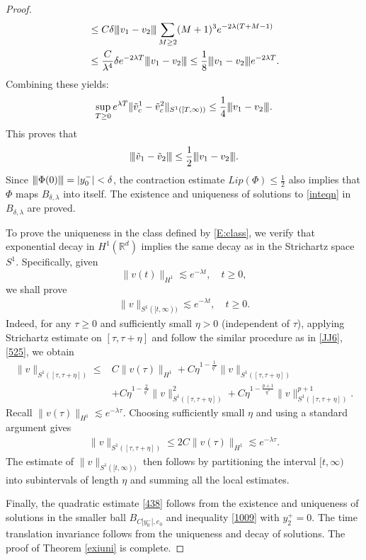 \documentclass[12pt]{amsart}
\newcommand{\R}{\mathbb R}
\newcommand{\lsm}{\lesssim}
\newcommand{\vertiii}[1]{{\left\vert\kern-0.25ex\left\vert\kern-0.25ex\left\vert #1 
    \right\vert\kern-0.25ex\right\vert\kern-0.25ex\right\vert}}
\begin{document}
\begin{proof}
\begin{align*}
	   &\le C\delta \vertiii{v_1-v_2} \sum_{
			   M\ge 2
                   	      }(M+1)^3  e^{-2\lambda (T+M-1)} \\
	  & \le \frac C{\lambda^4} \delta e^{-2\lambda T}\vertiii{v_1-v_2}\le \frac 18\vertiii{v_1-v_2} e^{-2\lambda T}. 
	   \end{align*}
Combining these yields:
\begin{align}\label{1016}
\sup_{T\ge 0}e^{\lambda T}\|\tilde v^1_c-\tilde v^2_c\|_{ S^1([T,\infty))}\le\frac 14 \vertiii{v_1-v_2}.
\end{align}
This proves that 
\begin{align*}
\vertiii{\tilde v_1-\tilde v_2}\le \frac 12\vertiii{v_1-v_2}.
\end{align*}
Since $\vertiii {\Phi(0)} = |y_0^-| < \delta$,  the contraction estimate $Lip( \Phi) \le \frac 12$ also implies that  
$\Phi$ maps $B_{\delta,\lambda}$ into itself. The existence and uniqueness of solutions to \eqref{inteqn} in $B_{\delta,\lambda}$ are proved. 


  



To prove the uniqueness in the class defined by \eqref{E:class}, we verify that 
exponential decay in $H^1(\R^d)$ implies the same decay as in the Strichartz space $S^1$. Specifically, given 
\[
\|v(t) \|_{H^1} \lsm e^{-\lambda t}, \quad t\ge 0,
\]
we shall prove
\begin{align}\label{a101}
\| v\|_{S^1 ([t, \infty))} \lsm e^{-\lambda t}, \quad t\ge 0.
\end{align}
Indeed, for any $\tau\ge 0$ and sufficiently small $\eta>0$ (independent of $\tau$), applying Strichartz estimate on $[\tau, \tau+\eta]$ and follow the similar procedure as in \eqref{JJ6}, \eqref{525}, we obtain
\begin{align*}
\|v\|_{ S^1{([\tau,\tau+\eta])}}\le &C\|v(\tau)\|_{H^1}+C\eta^{1-\frac 1{q^*}}\|v\|_{ S^1{([\tau,\tau+\eta])}}\\
&+C\eta^{1-\frac 2{q^*}}\|v\|_{ S^1{([\tau,\tau+\eta])}}^2+C\eta^{1-\frac{p+1}{q^*}}\|v\|_{ S^1{([\tau,\tau+\eta])}}^{p+1}.
\end{align*}
 Recall $\|v(\tau)\|_{H^1}\lsm e^{-\lambda \tau}$. Choosing sufficiently small $\eta$ and using a standard argument gives 
\begin{align*}
\|v\|_{S^1([\tau,\tau+\eta])}\le 2C\|v(\tau)\|_{H^1}\lsm e^{-\lambda \tau}. 
\end{align*}
The estimate of $\|v\|_{ S^1([t,\infty))}$ then follows by partitioning the interval $[t,\infty)$ into subintervals of length $\eta$ and summing all the local estimates.

Finally, the quadratic estimate \eqref{438} follows from the existence and uniqueness of solutions in the smaller ball $B_{C |y_0^-|, e_0}$ and inequality \eqref{1009} with $y_2^+ =0$. The time translation invariance follows from the uniqueness and decay of solutions. The proof of Theorem \ref{exiuni} is complete. 
\end{proof}
\end{document}

